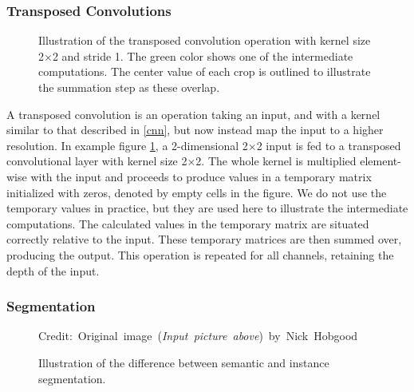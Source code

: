 \subsubsection{Transposed Convolutions}
    \begin{figure}[H]
        \centering
        
        
        
        \caption[Transposed convolution]{Illustration of the transposed convolution operation with kernel size 2×2 and stride 1. The green color shows one of the intermediate computations. The center value of each crop is outlined to illustrate the summation step as these overlap.}
      	\medskip 
        \label{transposed_conv_fig}
    \end{figure}
    A transposed convolution is an operation taking an input, and with a kernel similar to that described in \ref{cnn}, but now instead map the input to a higher resolution\cite{dumoulin2016guide_transposed_convolution}. In example figure \ref{transposed_conv_fig}, a 2-dimensional 2×2 input is fed to a transposed convolutional layer with kernel size 2×2. The whole kernel is multiplied element-wise with the input and proceeds to produce values in a temporary matrix initialized with zeros, denoted by empty cells in the figure. We do not use the temporary values in practice, but they are used here to illustrate the intermediate computations. The calculated values in the temporary matrix are situated correctly relative to the input. These temporary matrices are then summed over, producing the output. This operation is repeated for all channels, retaining the depth of the input. 
            


\subsubsection{Segmentation}
    \begin{figure}[H]
        \centering
        
        \caption[Difference between semantic and instance segmentation]{Illustration of the difference between semantic and instance segmentation.}
      	\medskip 
        \hspace*{15pt}\hbox{\scriptsize Credit: Original image (\textit{Input picture above}) by Nick Hobgood\cite{clownfish_image}}
        \label{segmentation_fig}
    \end{figure}

